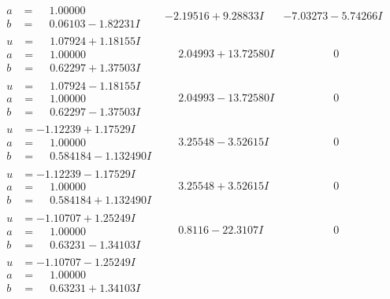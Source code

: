 \documentclass[1p]{elsarticle_modified}
\theoremstyle{definition}
\begin{document}
$$\begin{array}{c|c|c}
\begin{aligned}
a &= \phantom{-}1.00000\phantom{ +0.000000I} \\
b &= \phantom{-}0.06103 - 1.82231 I\end{aligned}
 & -2.19516 + 9.28833 I & -7.03273 - 5.74266 I \\ \hline\begin{aligned}
u &= \phantom{-}1.07924 + 1.18155 I \\
a &= \phantom{-}1.00000\phantom{ +0.000000I} \\
b &= \phantom{-}0.62297 + 1.37503 I\end{aligned}
 & \phantom{-}2.04993 + 13.72580 I & \phantom{-0.000000 } 0 \\ \hline\begin{aligned}
u &= \phantom{-}1.07924 - 1.18155 I \\
a &= \phantom{-}1.00000\phantom{ +0.000000I} \\
b &= \phantom{-}0.62297 - 1.37503 I\end{aligned}
 & \phantom{-}2.04993 - 13.72580 I & \phantom{-0.000000 } 0 \\ \hline\begin{aligned}
u &= -1.12239 + 1.17529 I \\
a &= \phantom{-}1.00000\phantom{ +0.000000I} \\
b &= \phantom{-}0.584184 - 1.132490 I\end{aligned}
 & \phantom{-}3.25548 - 3.52615 I & \phantom{-0.000000 } 0 \\ \hline\begin{aligned}
u &= -1.12239 - 1.17529 I \\
a &= \phantom{-}1.00000\phantom{ +0.000000I} \\
b &= \phantom{-}0.584184 + 1.132490 I\end{aligned}
 & \phantom{-}3.25548 + 3.52615 I & \phantom{-0.000000 } 0 \\ \hline\begin{aligned}
u &= -1.10707 + 1.25249 I \\
a &= \phantom{-}1.00000\phantom{ +0.000000I} \\
b &= \phantom{-}0.63231 - 1.34103 I\end{aligned}
 & \phantom{-}0.8116 - 22.3107 I & \phantom{-0.000000 } 0 \\ \hline\begin{aligned}
u &= -1.10707 - 1.25249 I \\
a &= \phantom{-}1.00000\phantom{ +0.000000I} \\
b &= \phantom{-}0.63231 + 1.34103 I\end{aligned}

\end{array}$$
\end{document}
